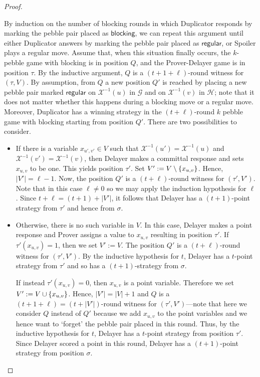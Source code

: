 \documentclass[a4paper,english, thm-restate]{lipics-v2021}
\DeclarePairedDelimiter\set{\lbrace}{\rbrace}
\newcommand{\regular}{\mathsf{regular}}
\newcommand{\blocking}{\mathsf{blocking}}
\newcommand{\graphG}{\mathcal{G}}
\newcommand{\graphH}{\mathcal{H}}
\newcommand{\X}{\mathcal{X}}
\newcommand{\XI}{\X^{-1}}
\begin{document}
\begin{proof}
\begin{claimproof}
By induction on the number of blocking rounds in which Duplicator responds by marking the pebble pair placed as $\blocking$,
we can repeat this argument until either Duplicator answers by marking the pebble pair placed as $\regular$, or Spoiler plays a regular move. 
Assume that, when this situation finally occurs, the $k$-pebble game with blocking is in position $Q$,
and the Prover-Delayer game is in position $\tau$. 
By the inductive argument, $Q$ is a $(t+1+\ell)$-round witness for $(\tau,V)$. By assumption, from $Q$ a new position $Q'$ is reached by placing a new pebble pair marked $\regular$ on $\XI(u)$ in $\graphG$ and on $\XI(v)$ in $\graphH$; note that it does not matter whether this happens during a blocking move or a regular move. Moreover, Duplicator has a winning strategy in the $(t+ \ell)$-round $k$ pebble game with blocking starting from position $Q'$. There are two possibilities to consider.
%
\begin{itemize}
        \item 
If there is a variable $x_{u', v'} \in V$ such that $\XI(u') = \XI(u)$ and $\XI(v') = \XI(v)$, then Delayer makes a committal response and sets $x_{u,v}$ to be one.
This yields position $\tau'$. Set $V' := V \setminus \set{x_{u, v}}$.
Hence, $|V'| = \ell -1$. Now, the position $Q'$ is a $(t+\ell)$-round witness for $(\tau',V')$. Note that in this case $\ell \neq 0$ so we may apply the induction hypothesis for $\ell$. Since $t+\ell = (t+1) + |V'|$, it follows that
Delayer has a $(t+1)$-point strategy from
$\tau'$ and hence from $\sigma$.

\item Otherwise, there is no such variable in $V$. In this  case, Delayer makes a point response and Prover assigns a value to $x_{u,v}$ resulting in position $\tau'$.
If $\tau'(x_{u,v})=1$, then we set $V' := V$.
The position $Q'$ is a $(t+\ell)$-round witness for $(\tau',V')$.
By the inductive hypothesis for $t$, Delayer has a $t$-point strategy from $\tau'$ and so has a $(t+1)$-strategy from $\sigma$.

If instead $\tau'(x_{u,v})=0$, then $x_{u,v}$ is a point variable.
Therefore we set $V' := V \cup \set{x_{u,v}}$. Hence, $|V'| = |V| + 1$ and $Q$ is a $(t+1+\ell)=(t+|V'|)$-round witness for $(\tau',V')$---note that here we consider $Q$ instead of $Q'$ because we add $x_{u,v}$ to the point variables and we hence want to `forget' the pebble pair placed in this round. 
Thus, by the inductive hypothesis for $t$, Delayer has a $t$-point strategy from position $\tau'$. Since Delayer scored a point in this round,
Delayer has a $(t+1)$-point strategy from position $\sigma$.
\end{itemize}


\end{claimproof}
\end{proof}
\end{document}
